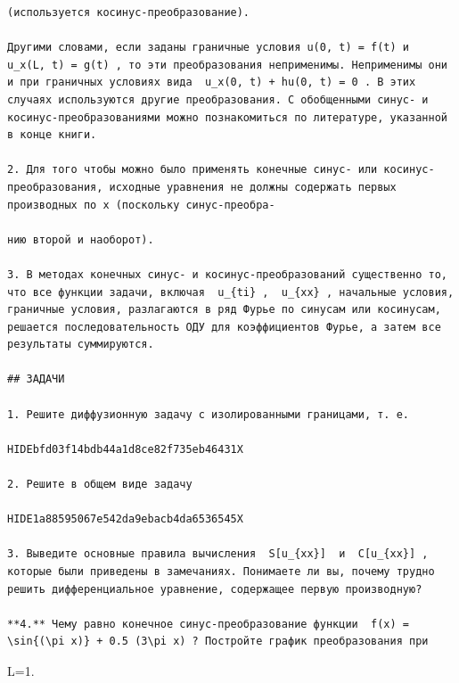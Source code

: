 \documentclass[
  ukrainian,
]{article}
\begin{document}
\begin{verbatim}
(используется косинус-преобразование).

Другими словами, если заданы граничные условия u(0, t) = f(t) и  u_x(L, t) = g(t) , то эти преобразования неприменимы. Неприменимы они и при граничных условиях вида  u_x(0, t) + hu(0, t) = 0 . В этих случаях используются другие преобразования. С обобщенными синус- и косинус-преобразованиями можно познакомиться по литературе, указанной в конце книги.

2. Для того чтобы можно было применять конечные синус- или косинус-преобразования, исходные уравнения не должны содержать первых производных по x (поскольку синус-преобра-

нию второй и наоборот).

3. В методах конечных синус- и косинус-преобразований существенно то, что все функции задачи, включая  u_{ti} ,  u_{xx} , начальные условия, граничные условия, разлагаются в ряд Фурье по синусам или косинусам, решается последовательность ОДУ для коэффициентов Фурье, а затем все результаты суммируются.

## ЗАДАЧИ

1. Решите диффузионную задачу с изолированными границами, т. е.

HIDEbfd03f14bdb44a1d8ce82f735eb46431X

2. Решите в общем виде задачу

HIDE1a88595067e542da9ebacb4da6536545X

3. Выведите основные правила вычисления  S[u_{xx}]  и  C[u_{xx}] , которые были приведены в замечаниях. Понимаете ли вы, почему трудно решить дифференциальное уравнение, содержащее первую производную?

**4.** Чему равно конечное синус-преобразование функции  f(x) = \sin{(\pi x)} + 0.5 (3\pi x) ? Постройте график преобразования при
\end{verbatim}

L=1.
\end{document}
